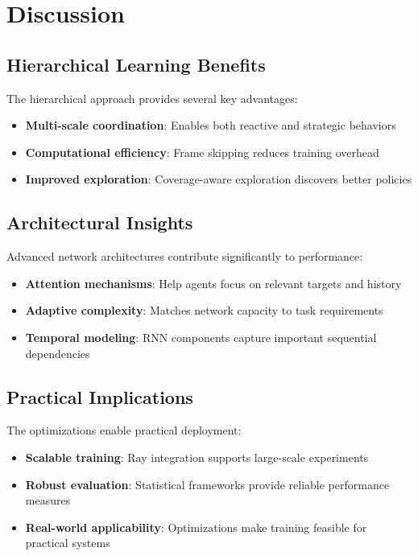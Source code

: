 \documentclass[conference]{IEEEtran}
\begin{document}
\section{Discussion}

\subsection{Hierarchical Learning Benefits}
The hierarchical approach provides several key advantages:
\begin{itemize}
\item \textbf{Multi-scale coordination}: Enables both reactive and strategic behaviors
\item \textbf{Computational efficiency}: Frame skipping reduces training overhead
\item \textbf{Improved exploration}: Coverage-aware exploration discovers better policies
\end{itemize}

\subsection{Architectural Insights}
Advanced network architectures contribute significantly to performance:
\begin{itemize}
\item \textbf{Attention mechanisms}: Help agents focus on relevant targets and history
\item \textbf{Adaptive complexity}: Matches network capacity to task requirements
\item \textbf{Temporal modeling}: RNN components capture important sequential dependencies
\end{itemize}

\subsection{Practical Implications}
The optimizations enable practical deployment:
\begin{itemize}
\item \textbf{Scalable training}: Ray integration supports large-scale experiments
\item \textbf{Robust evaluation}: Statistical frameworks provide reliable performance measures
\item \textbf{Real-world applicability}: Optimizations make training feasible for practical systems
\end{itemize}
\end{document}
